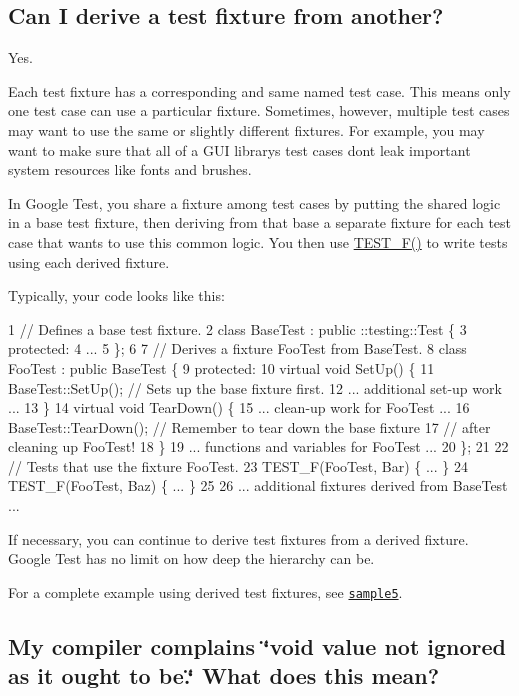 \subsection*{Can I derive a test fixture from another?}

Yes.

Each test fixture has a corresponding and same named test case. This means only one test case can use a particular fixture. Sometimes, however, multiple test cases may want to use the same or slightly different fixtures. For example, you may want to make sure that all of a G\+UI library\textquotesingle{}s test cases don\textquotesingle{}t leak important system resources like fonts and brushes.

In Google Test, you share a fixture among test cases by putting the shared logic in a base test fixture, then deriving from that base a separate fixture for each test case that wants to use this common logic. You then use {\ttfamily \hyperlink{gtest_8h_a0ee66d464d1a06c20c1929cae09d8758}{T\+E\+S\+T\+\_\+\+F()}} to write tests using each derived fixture.

Typically, your code looks like this\+:


\begin{DoxyCode}
1 // Defines a base test fixture.
2 class BaseTest : public ::testing::Test \{
3   protected:
4    ...
5 \};
6 
7 // Derives a fixture FooTest from BaseTest.
8 class FooTest : public BaseTest \{
9   protected:
10     virtual void SetUp() \{
11       BaseTest::SetUp();  // Sets up the base fixture first.
12       ... additional set-up work ...
13     \}
14     virtual void TearDown() \{
15       ... clean-up work for FooTest ...
16       BaseTest::TearDown();  // Remember to tear down the base fixture
17                              // after cleaning up FooTest!
18     \}
19     ... functions and variables for FooTest ...
20 \};
21 
22 // Tests that use the fixture FooTest.
23 TEST\_F(FooTest, Bar) \{ ... \}
24 TEST\_F(FooTest, Baz) \{ ... \}
25 
26 ... additional fixtures derived from BaseTest ...
\end{DoxyCode}


If necessary, you can continue to derive test fixtures from a derived fixture. Google Test has no limit on how deep the hierarchy can be.

For a complete example using derived test fixtures, see \href{../samples/sample5_unittest.cc}{\tt sample5}.

\subsection*{My compiler complains \char`\"{}void value not ignored as it ought to be.\char`\"{} What does this mean?}

